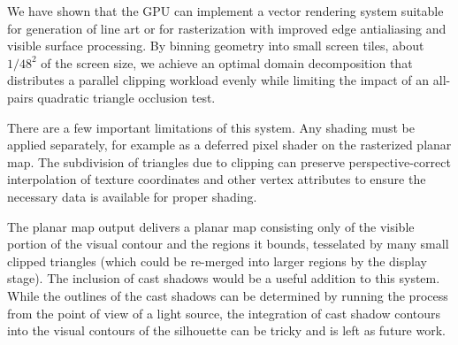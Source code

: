 \documentclass[review]{acmsiggraph}
\begin{document}
We have shown that the GPU can implement a vector rendering system suitable
for generation of line art or for rasterization with improved edge
antialiasing and visible surface processing. By binning geometry into small
screen tiles, about $1/48^2$ of the screen size, we achieve an optimal domain
decomposition that distributes a parallel clipping workload evenly while
limiting the impact of an all-pairs quadratic triangle occlusion test.

There are a few important limitations of this system. Any shading must be
applied separately, for example as a deferred pixel shader on the rasterized
planar map. The subdivision of triangles due to clipping can preserve
perspective-correct interpolation of texture coordinates and other vertex
attributes to ensure the necessary data is available for proper shading.

The planar map output delivers a planar map consisting only of the visible
portion of the visual contour and the regions it bounds, tesselated by many
small clipped triangles (which could be re-merged into larger regions by the
display stage). The inclusion of cast shadows would be a useful addition to
this system. While the outlines of the cast shadows can be determined by
running the process from the point of view of a light source, the integration
of cast shadow contours into the visual contours of the silhouette can be
tricky and is left as future work.



\end{document}
